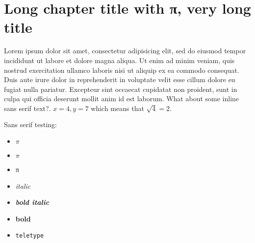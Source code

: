 \chapter{Long chapter title with π, very long title}

Lorem ipsum dolor sit amet, consectetur adipisicing elit, sed do eiusmod tempor incididunt ut labore et dolore magna aliqua. Ut enim ad minim veniam, quis nostrud exercitation ullamco laboris nisi ut aliquip ex ea commodo consequat. Duis aute irure dolor in reprehenderit in voluptate velit esse cillum dolore eu fugiat nulla pariatur. Excepteur sint occaecat cupidatat non proident, sunt in culpa qui officia deserunt mollit anim id est laborum. \textsf{What about some inline sans serif text?}. $x = 4, y= 7$ which means that $\sqrt{4} = 2$.

Sans serif testing:
\begin{itemize}
    \item \textsf{$\pi$}
    \item \textsf{$π$}
    \item \textsf{π}
    \item \textsf{\emph{italic}}
    \item \textsf{\textbf{\emph{bold italic}}}
    \item \textsf{\textbf{bold}}
    \item \textsf{\texttt{teletype}}
\end{itemize}

